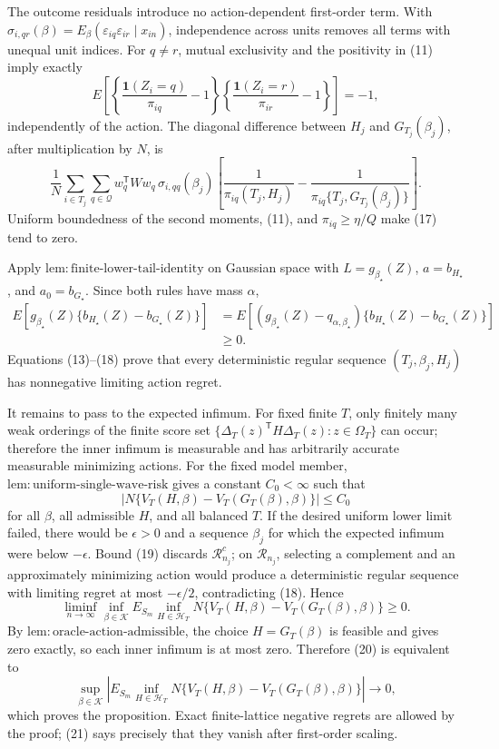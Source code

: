 The outcome residuals introduce no action-dependent first-order term.  With
\(\sigma_{i,qr}(\beta)=E_\beta(\varepsilon_{iq}\varepsilon_{ir}\mid x_{in})\), independence across units removes all terms with unequal unit indices.  For \(q\neq r\), mutual exclusivity and the positivity in (11) imply exactly
\[
E\!\left[
\left\{\frac{\mathbf 1(Z_i=q)}{\pi_{iq}}-1\right\}
\left\{\frac{\mathbf 1(Z_i=r)}{\pi_{ir}}-1\right\}
\right]=-1,
\tag{16}
\]
independently of the action.  The diagonal difference between \(H_j\) and \(G_{T_j}(\beta_j)\), after multiplication by \(N\), is
\[
\frac1N\sum_{i\in T_j}\sum_{q\in\mathcal Q}
w_q^{\mathsf T}Ww_q\,\sigma_{i,qq}(\beta_j)
\left[
\frac1{\pi_{iq}(T_j,H_j)}
-\frac1{\pi_{iq}\{T_j,G_{T_j}(\beta_j)\}}
\right].
\tag{17}
\]
Uniform boundedness of the second moments, (11), and \(\pi_{iq}\geq\eta/Q\) make (17) tend to zero.

Apply \(\mathrm{lem{:}finite\text{-}lower\text{-}tail\text{-}identity}\) on Gaussian space with
\(L=g_{\beta_\star}(Z)\), \(a=b_{H_\star}\), and \(a_0=b_{G_\star}\).  Since both rules have mass \(\alpha\),
\[
\begin{aligned}
E\!\left[g_{\beta_\star}(Z)
\{b_{H_\star}(Z)-b_{G_\star}(Z)\}\right]
&=E\!\left[(g_{\beta_\star}(Z)-q_{\alpha,\beta_\star})
\{b_{H_\star}(Z)-b_{G_\star}(Z)\}\right]\\
&\geq0.
\end{aligned}
\tag{18}
\]
Equations (13)--(18) prove that every deterministic regular sequence \((T_j,\beta_j,H_j)\) has nonnegative limiting action regret.

It remains to pass to the expected infimum.  For fixed finite \(T\), only finitely many weak orderings of the finite score set \(\{\Delta_T(z)^{\mathsf T}H\Delta_T(z):z\in\Omega_T\}\) can occur; therefore the inner infimum is measurable and has arbitrarily accurate measurable minimizing actions.  For the fixed model member, \(\mathrm{lem{:}uniform\text{-}single\text{-}wave\text{-}risk}\) gives a constant \(C_0<\infty\) such that
\[
\left|N\{V_T(H,\beta)-V_T(G_T(\beta),\beta)\}\right|
\leq C_0
\tag{19}
\]
for all \(\beta\), all admissible \(H\), and all balanced \(T\).  If the desired uniform lower limit failed, there would be \(\epsilon>0\) and a sequence \(\beta_j\) for which the expected infimum were below \(-\epsilon\).  Bound (19) discards \(\mathcal R_{n_j}^c\); on \(\mathcal R_{n_j}\), selecting a complement and an approximately minimizing action would produce a deterministic regular sequence with limiting regret at most \(-\epsilon/2\), contradicting (18).  Hence
\[
\liminf_{n\to\infty}\inf_{\beta\in\mathcal K}
E_{S_m}\inf_{H\in\mathcal H_T}
N\{V_T(H,\beta)-V_T(G_T(\beta),\beta)\}
\geq0.
\tag{20}
\]
By \(\mathrm{lem{:}oracle\text{-}action\text{-}admissible}\), the choice \(H=G_T(\beta)\) is feasible and gives zero exactly, so each inner infimum is at most zero.  Therefore (20) is equivalent to
\[
\sup_{\beta\in\mathcal K}
\left|
E_{S_m}\inf_{H\in\mathcal H_T}
N\{V_T(H,\beta)-V_T(G_T(\beta),\beta)\}
\right|\longrightarrow0,
\tag{21}
\]
which proves the proposition.  Exact finite-lattice negative regrets are allowed by the proof; (21) says precisely that they vanish after first-order scaling.

